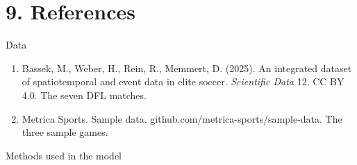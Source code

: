 \documentclass[10pt,a4paper]{article}
\begin{document}
\section*{9. References}


Data


\begin{enumerate}\setlength{\itemsep}{2pt}

\item Bassek, M., Weber, H., Rein, R., Memmert, D. (2025). An integrated dataset of spatiotemporal
   and event data in elite soccer. \emph{Scientific Data} 12. CC BY 4.0. The seven DFL matches.

\item Metrica Sports. Sample data. github.com/metrica-sports/sample-data. The three sample games.

\end{enumerate}


Methods used in the model
\end{document}
